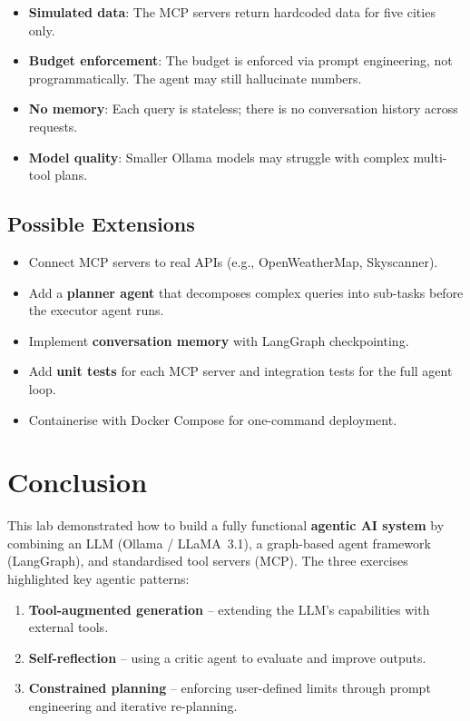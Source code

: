 \documentclass[12pt,a4paper]{article}
\begin{document}
\begin{itemize}[nosep]
  \item \textbf{Simulated data}: The MCP servers return hardcoded data for
        five cities only.
  \item \textbf{Budget enforcement}: The budget is enforced via prompt
        engineering, not programmatically.  The agent may still hallucinate
        numbers.
  \item \textbf{No memory}: Each query is stateless; there is no
        conversation history across requests.
  \item \textbf{Model quality}: Smaller Ollama models may struggle with
        complex multi-tool plans.
\end{itemize}

\subsection{Possible Extensions}

\begin{itemize}[nosep]
  \item Connect MCP servers to real APIs (e.g., OpenWeatherMap, Skyscanner).
  \item Add a \textbf{planner agent} that decomposes complex queries into
        sub-tasks before the executor agent runs.
  \item Implement \textbf{conversation memory} with LangGraph checkpointing.
  \item Add \textbf{unit tests} for each MCP server and integration tests
        for the full agent loop.
  \item Containerise with Docker Compose for one-command deployment.
\end{itemize}

\section{Conclusion}

This lab demonstrated how to build a fully functional \textbf{agentic AI
system} by combining an LLM (Ollama / LLaMA~3.1), a graph-based agent
framework (LangGraph), and standardised tool servers (MCP).  The three
exercises highlighted key agentic patterns:

\begin{enumerate}[nosep]
  \item \textbf{Tool-augmented generation} – extending the LLM's
        capabilities with external tools.
  \item \textbf{Self-reflection} – using a critic agent to evaluate and
        improve outputs.
  \item \textbf{Constrained planning} – enforcing user-defined limits
        through prompt engineering and iterative re-planning.
\end{enumerate}
\end{document}

